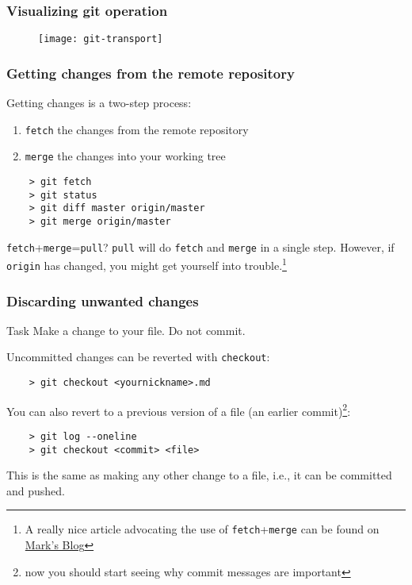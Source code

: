 
\begin{frame}[fragile]
	\frametitle{Visualizing git operation}
	
	\begin{figure}
		\texttt{[image: git-transport]}
	\end{figure}
\end{frame}



\begin{frame}[fragile]
	\frametitle{Getting changes from the remote repository}
	
	Getting changes is a two-step process:
	\begin{enumerate}
		\item \texttt{fetch} the changes from the remote repository
		\item \texttt{merge} the changes into your working tree
	\end{enumerate}
	
	\begin{verbatim}
	> git fetch
	> git status
	> git diff master origin/master
	> git merge origin/master
	\end{verbatim}
	
	\begin{block}{\texttt{fetch}+\texttt{merge}=\texttt{pull}?}
	\texttt{pull} will do \texttt{fetch} and \texttt{merge} in a single step. However, if \texttt{origin} has changed, you might get yourself into trouble.\footnote{A really nice article advocating the use of \texttt{fetch}+\texttt{merge} can be found on \href{http://longair.net/blog/2009/04/16/git-fetch-and-merge/}{Mark's Blog}} 
	\end{block}
\end{frame}


\begin{frame}[fragile]
	\frametitle{Discarding unwanted changes}
	
	\begin{block}{Task}
	Make a change to your file. Do not commit.	
	\end{block}
	
	Uncommitted changes can be reverted with \texttt{checkout}:
	\begin{verbatim}
	> git checkout <yournickname>.md
	\end{verbatim}
	
	You can also revert to a previous version of a file (an earlier commit)\footnote{now you should start seeing why commit messages are important}:
	\begin{verbatim}
	> git log --oneline
	> git checkout <commit> <file>
	\end{verbatim}
	This is the same as making any other change to a file, i.e., it can be committed and pushed.
\end{frame}

